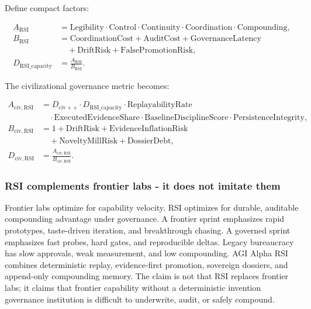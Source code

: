 \documentclass[
  11pt,
]{article}
\begin{document}
Define compact factors:

\[
\begin{aligned}
A_{\mathrm{RSI}} &=
\mathrm{Legibility}\cdot\mathrm{Control}\cdot\mathrm{Continuity}
\cdot\mathrm{Coordination}\cdot\mathrm{Compounding},\\
B_{\mathrm{RSI}} &=
\mathrm{CoordinationCost}+\mathrm{AuditCost}+\mathrm{GovernanceLatency}\\
&\quad+\mathrm{DriftRisk}+\mathrm{FalsePromotionRisk},\\
D_{\mathrm{RSI\_capacity}} &= \frac{A_{\mathrm{RSI}}}{B_{\mathrm{RSI}}}.
\end{aligned}
\]

The civilizational governance metric becomes:

\[
\begin{aligned}
A_{\mathrm{civ,RSI}} &=
D_{\mathrm{civ++}}\cdot D_{\mathrm{RSI\_capacity}}
\cdot\mathrm{ReplayabilityRate}\\
&\quad\cdot\mathrm{ExecutedEvidenceShare}
\cdot\mathrm{BaselineDisciplineScore}
\cdot\mathrm{PersistenceIntegrity},\\
B_{\mathrm{civ,RSI}} &=
1+\mathrm{DriftRisk}+\mathrm{EvidenceInflationRisk}\\
&\quad+\mathrm{NoveltyMillRisk}+\mathrm{DossierDebt},\\
D_{\mathrm{civ,RSI}} &= \frac{A_{\mathrm{civ,RSI}}}{B_{\mathrm{civ,RSI}}}.
\end{aligned}
\]

\subsubsection{RSI complements frontier labs - it does not imitate
them}\label{rsi-complements-frontier-labs---it-does-not-imitate-them}

Frontier labs optimize for capability velocity. RSI optimizes for
durable, auditable compounding advantage under governance. A frontier
sprint emphasizes rapid prototypes, taste-driven iteration, and
breakthrough chasing. A governed sprint emphasizes fast probes, hard
gates, and reproducible deltas. Legacy bureaucracy has slow approvals,
weak measurement, and low compounding. AGI Alpha RSI combines
deterministic replay, evidence-first promotion, sovereign dossiers, and
append-only compounding memory. The claim is not that RSI replaces
frontier labs; it claims that frontier capability without a
deterministic invention governance institution is difficult to
underwrite, audit, or safely compound.
\end{document}
